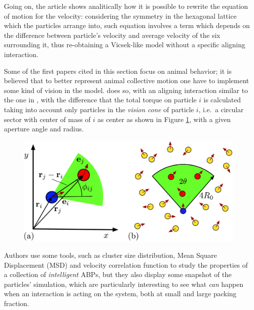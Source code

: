 \documentclass[../../master_thesis_np.tex]{subfiles}
\begin{document}
		Going on, the article shows analitically how it is possible to rewrite the equation of motion for the velocity: considering the symmetry in the hexagonal lattice which the particles arrange into, such equation involves a term which depends on the difference between particle's velocity and average velocity of the six surrounding it, thus re-obtaining a Vicsek-like model without a specific aligning interaction.
		
		Some of the first papers cited in this section focus on animal behavior; it is believed that to better represent animal collective motion one have to implement some kind of vision in the model. \cite{negi_emergent_2022} does so, with an aligning interaction similar to the one in \cite{martin-gomez_collective_2018}, with the difference that the total torque on particle $i$ is calculated taking into account only particles in the \emph{vision cone} of particle $i$, i.e.\ a circular sector with center of mass of $i$ as center as shown in Figure \ref{fig:negi_vision1}, with a given aperture angle and radius.
		\vfill
		
		\begin{figure}[htp]
			\centering
			\includegraphics[width=\singfigwidth]{negi_vision1.png}
			\caption{\cite{negi_emergent_2022}}
			\label{fig:negi_vision1}
		\end{figure}
		
		
		Authors use some tools, such as cluster size distribution, Mean Square Displacement (MSD) and velocity correlation function to study the properties of a collection of \emph{intelligent} ABPs, but they also display some snapshot of the particles' simulation, which are particularly interesting to see what \emph{can} happen when an interaction is acting on the system, both at small and large packing fraction. 
		
\end{document}
